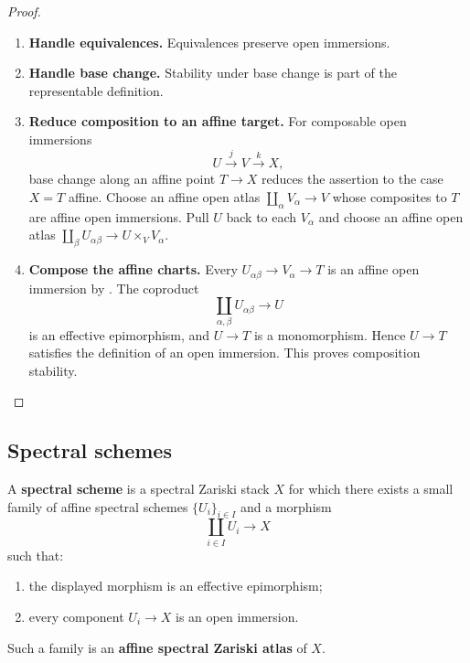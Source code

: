 \begin{proof}
\leavevmode
\begin{enumerate}[label=\textup{(\arabic*)}]
    \item \textbf{Handle equivalences.}
    Equivalences preserve open immersions.

    \item \textbf{Handle base change.}
    Stability under base change is
    part of the representable definition.

    \item \textbf{Reduce composition to an affine target.}
    For composable open immersions
    \[
        U\xrightarrow{j}V\xrightarrow{k}X,
    \]
    base change along an affine point \(T\to X\) reduces the assertion to
    the case \(X=T\) affine. Choose an affine open atlas
    \(\coprod_\alpha V_\alpha\to V\) whose composites to \(T\) are affine
    open immersions. Pull \(U\) back to each \(V_\alpha\) and choose an
    affine open atlas \(\coprod_\beta U_{\alpha\beta}\to
    U\times_VV_\alpha\).

    \item \textbf{Compose the affine charts.}
    Every
    \(U_{\alpha\beta}\to V_\alpha\to T\) is an affine open immersion by
    . The coproduct
    \[
        \coprod_{\alpha,\beta}U_{\alpha\beta}\longrightarrow U
    \]
    is an effective epimorphism, and \(U\to T\) is a monomorphism. Hence
    \(U\to T\) satisfies the definition of an open immersion. This proves
    composition stability.
\end{enumerate}
\end{proof}

\subsection{Spectral schemes}

\begin{definition}
\label{def:spectral-scheme}
A \textbf{spectral scheme} is a spectral Zariski stack $X$ for which there
exists a small family of affine spectral schemes $\{U_i\}_{i\in I}$ and a
morphism
\[
    \coprod_{i\in I}U_i
    \longrightarrow
    X
\]
such that:
\begin{enumerate}[label=(\roman*)]
    \item the displayed morphism is an effective epimorphism;

    \item every component $U_i\to X$ is an open immersion.
\end{enumerate}
Such a family is an \textbf{affine spectral Zariski atlas} of $X$.
\end{definition}

